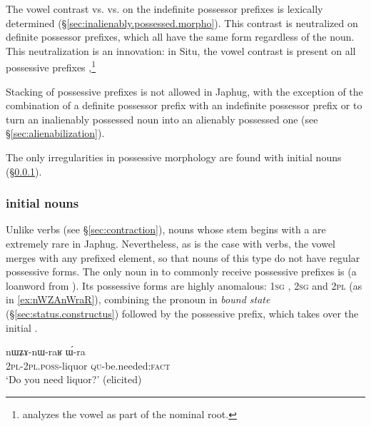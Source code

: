 The vowel contrast   vs.  vs.  on the indefinite possessor prefixes is lexically determined (§\ref{sec:inalienably.possessed.morpho}). This contrast is neutralized on definite possessor prefixes, which all have the same form regardless of the noun. This neutralization is an innovation: in Situ, the vowel contrast is present on all possessive prefixes \citep[168--169]{linxr93jiarong},\footnote{\citet[118--119]{prins16kyomkyo} analyzes the vowel as part of the nominal root.} 

Stacking of possessive prefixes is not allowed in Japhug, with the exception of the combination of a definite possessor prefix with an indefinite possessor prefix  or  to turn an inalienably possessed noun into an alienably possessed one (see §\ref{sec:alienabilization}).

The only irregularities in possessive morphology are found with  initial nouns (§\ref{sec:a.nouns}).

\subsubsection{ initial nouns}  \label{sec:a.nouns}

Unlike verbs (see §\ref{sec:contraction}), nouns whose stem begins with a  are extremely rare in Japhug. Nevertheless, as is the case with verbs, the vowel  merges with any prefixed element, so that nouns of this type do not have regular possessive forms. The only noun in  to commonly receive possessive prefixes is  (a loanword from ). Its possessive forms are highly anomalous: \textsc{1sg} , \textsc{2sg}  and \textsc{2pl}  (as in \ref{ex:nWZAnWraR}), combining the pronoun in \textit{bound state} (§\ref{sec:status.constructus}) followed by the possessive prefix, which takes over the initial .

\begin{exe}
\ex \label{ex:nWZAnWraR}
\gll nɯʑɤ-nɯ-raʁ ɯ́-ra \\
\textsc{2pl}-\textsc{2pl}.\textsc{poss}-liquor \textsc{qu}-be.needed:\textsc{fact} \\
\glt `Do you need liquor?' (elicited)
\end{exe}

